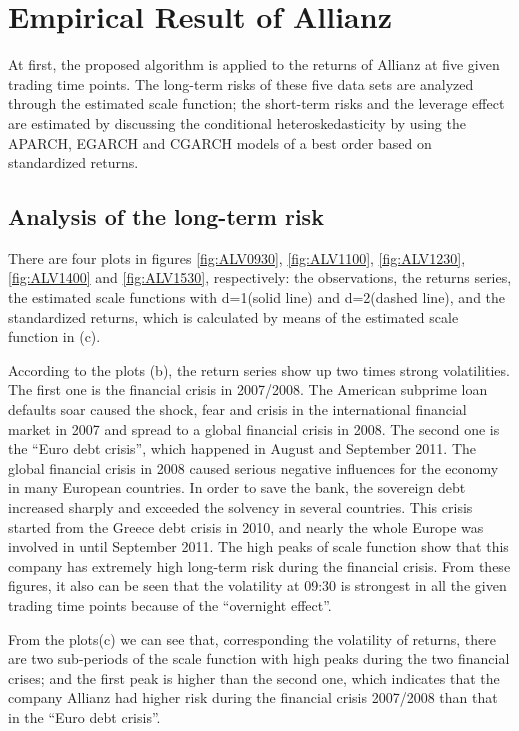\section{Empirical Result of Allianz}

At first, the proposed algorithm is applied to the returns of Allianz at five given trading time points. The long-term risks of these five data sets are analyzed through the estimated scale function; the short-term risks and the leverage effect are estimated by discussing the conditional heteroskedasticity by using the APARCH, EGARCH and CGARCH models of a best order based on standardized returns. 

\subsection{Analysis of the long-term risk}


There are four plots in figures \ref{fig:ALV0930}, \ref{fig:ALV1100}, \ref{fig:ALV1230}, \ref{fig:ALV1400} and \ref{fig:ALV1530}, respectively: the observations, the returns series, the estimated scale functions with d=1(solid line) and d=2(dashed line), and the standardized returns, which is calculated by means of the estimated scale function in (c). 

According to the plots (b), the return series show up two times strong volatilities. The first one is the financial crisis in 2007/2008. The American subprime loan defaults soar caused the shock, fear and crisis in the international financial market in 2007 and spread to a global financial crisis in 2008. The second one is the ``Euro debt crisis'', which happened in August and September 2011. The global financial crisis in 2008 caused serious negative influences for the economy in many European countries. In order to save the bank, the sovereign debt increased sharply and exceeded the solvency in several countries. This crisis started from the Greece debt crisis in 2010, and nearly the whole Europe was involved in until September 2011. The high peaks of scale function show that this company has extremely high long-term risk during the financial crisis. From these figures, it also can be seen that the volatility at 09:30 is strongest in all the given trading time points because of the ``overnight effect''. 

From the plots(c) we can see that, corresponding the volatility of returns, there are two sub-periods of the scale function with high peaks during the two financial crises; and the first peak is higher than the second one, which indicates that the company Allianz had higher risk during the financial crisis 2007/2008 than that in the ``Euro debt crisis''.

